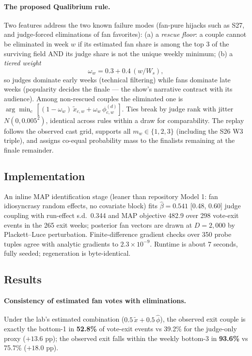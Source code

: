 \documentclass[11pt]{article}
\begin{document}
\paragraph{The proposed Qualibrium rule.} Two features address the two known
failure modes (fan-pure hijacks such as S27, and judge-forced eliminations of fan
favorites): (a) a \emph{rescue floor}: a couple cannot be eliminated in week $w$
if its estimated fan share is among the top 3 of the surviving field AND its judge
share is not the unique weekly minimum; (b) a \emph{tiered weight}
\begin{equation}
\omega_w = 0.3 + 0.4\,(w/W_s),
\label{eq:omega}
\end{equation}
so judges dominate early weeks (technical filtering) while fans dominate late
weeks (popularity decides the finale --- the show's narrative contract with its
audience). Among non-rescued couples the eliminated one is
$\arg\min_c\,[(1-\omega_w)\,\tilde x_{c,w} + \omega_w\,\phi^{(d)}_{c,w}]$.
Ties break by judge rank with jitter $N(0, 0.005^2)$, identical across rules
within a draw for comparability. The replay follows the observed cast grid,
supports all $m_w \in \{1,2,3\}$ (including the S26 W3 triple), and assigns
co-equal probability mass to the finalists remaining at the finale remainder.

\subsection{Implementation}

An inline MAP identification stage (leaner than repository Model 1: fan
idiosyncrasy random effects, no covariate block) fits $\hat\beta = 0.541$
[0.48, 0.60] judge coupling with run-effect s.d.\ 0.344 and MAP objective 482.9
over 298 vote-exit events in the 265 exit weeks; posterior fan vectors are drawn
at $D = 2{,}000$ by Plackett--Luce perturbation. Finite-difference gradient checks
over 350 probe tuples agree with analytic gradients to $2.3 \times 10^{-9}$.
Runtime is about 7 seconds, fully seeded; regeneration is byte-identical.

\subsection{Results}

\paragraph{Consistency of estimated fan votes with eliminations.} Under the lab's
estimated combination ($0.5\,\tilde x + 0.5\,\hat\phi$), the observed exit couple
is exactly the bottom-1 in \textbf{52.8\%} of vote-exit events vs 39.2\% for the
judge-only proxy ($+13.6$ pp); the observed exit falls within the weekly bottom-3
in \textbf{93.6\%} vs 75.7\% ($+18.0$ pp).
\end{document}

